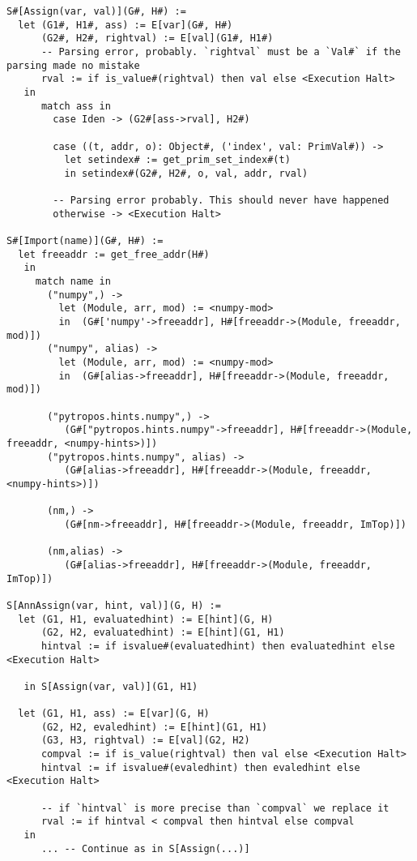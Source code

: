 \begin{verbatim}
S#[Assign(var, val)](G#, H#) :=
  let (G1#, H1#, ass) := E[var](G#, H#)
      (G2#, H2#, rightval) := E[val](G1#, H1#)
      -- Parsing error, probably. `rightval` must be a `Val#` if the parsing made no mistake
      rval := if is_value#(rightval) then val else <Execution Halt>
   in
      match ass in
        case Iden -> (G2#[ass->rval], H2#)

        case ((t, addr, o): Object#, ('index', val: PrimVal#)) ->
          let setindex# := get_prim_set_index#(t)
          in setindex#(G2#, H2#, o, val, addr, rval)

        -- Parsing error probably. This should never have happened
        otherwise -> <Execution Halt>

S#[Import(name)](G#, H#) :=
  let freeaddr := get_free_addr(H#)
   in
     match name in
       ("numpy",) ->
         let (Module, arr, mod) := <numpy-mod>
         in  (G#['numpy'->freeaddr], H#[freeaddr->(Module, freeaddr, mod)])
       ("numpy", alias) ->
         let (Module, arr, mod) := <numpy-mod>
         in  (G#[alias->freeaddr], H#[freeaddr->(Module, freeaddr, mod)])

       ("pytropos.hints.numpy",) ->
          (G#["pytropos.hints.numpy"->freeaddr], H#[freeaddr->(Module, freeaddr, <numpy-hints>)])
       ("pytropos.hints.numpy", alias) ->
          (G#[alias->freeaddr], H#[freeaddr->(Module, freeaddr, <numpy-hints>)])

       (nm,) ->
          (G#[nm->freeaddr], H#[freeaddr->(Module, freeaddr, ImTop)])

       (nm,alias) ->
          (G#[alias->freeaddr], H#[freeaddr->(Module, freeaddr, ImTop)])

S[AnnAssign(var, hint, val)](G, H) :=
  let (G1, H1, evaluatedhint) := E[hint](G, H)
      (G2, H2, evaluatedhint) := E[hint](G1, H1)
      hintval := if isvalue#(evaluatedhint) then evaluatedhint else <Execution Halt>

   in S[Assign(var, val)](G1, H1)

  let (G1, H1, ass) := E[var](G, H)
      (G2, H2, evaledhint) := E[hint](G1, H1)
      (G3, H3, rightval) := E[val](G2, H2)
      compval := if is_value(rightval) then val else <Execution Halt>
      hintval := if isvalue#(evaledhint) then evaledhint else <Execution Halt>

      -- if `hintval` is more precise than `compval` we replace it
      rval := if hintval < compval then hintval else compval
   in
      ... -- Continue as in S[Assign(...)]
\end{verbatim}
